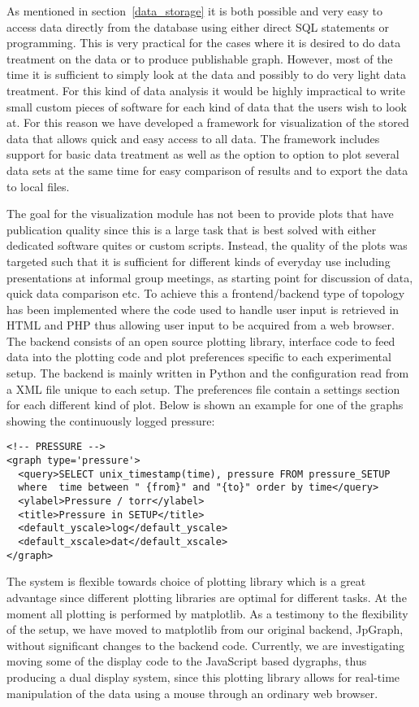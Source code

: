 As mentioned in section~\ref{data_storage} it is both possible and
very easy to access data directly from the database using either
direct SQL statements or programming. This is very practical for the
cases where it is desired to do data treatment on the data or to
produce publishable graph. However, most of the time it is sufficient
to simply look at the data and possibly to do very light data
treatment. For this kind of data analysis it would be highly
impractical to write small custom pieces of software for each kind of
data that the users wish to look at. For this reason we have developed
a framework for visualization of the stored data that allows quick and
easy access to all data. The framework includes support for basic data
treatment as well as the option to option to plot several data sets at
the same time for easy comparison of results and to export the data to
local files.

The goal for the visualization module has not been to provide plots
that have publication quality since this is a large task that is best
solved with either dedicated software quites or custom
scripts. Instead, the quality of the plots was targeted such that it
is sufficient for different kinds of everyday use including
presentations at informal group meetings, as starting point for
discussion of data, quick data comparison etc. To achieve this a
frontend/backend type of topology has been implemented where the code
used to handle user input is retrieved in HTML and PHP thus allowing
user input to be acquired from a web browser.  The backend consists of
an open source plotting library, interface code to feed data into the
plotting code and plot preferences specific to each experimental
setup. The backend is mainly written in Python\cite{python} and the
configuration read from a XML file unique to each setup. The
preferences file contain a settings section for each different kind of
plot. Below is shown an example for one of the graphs showing the
continuously logged pressure:
\begin{verbatim}
<!-- PRESSURE -->
<graph type='pressure'>
  <query>SELECT unix_timestamp(time), pressure FROM pressure_SETUP
  where  time between " {from}" and "{to}" order by time</query>
  <ylabel>Pressure / torr</ylabel>
  <title>Pressure in SETUP</title>
  <default_yscale>log</default_yscale>
  <default_xscale>dat</default_xscale>
</graph>
\end{verbatim}

The system is flexible towards choice of plotting library which is a
great advantage since different plotting libraries are optimal for
different tasks.  At the moment all plotting is performed by
matplotlib\cite{matplotlib}.  As a testimony to the flexibility of the
setup, we have moved to matplotlib from our original backend,
JpGraph\cite{jpgraph}, without significant changes to the backend
code. Currently, we are investigating moving some of the display code
to the JavaScript based dygraphs\cite{dygraphs}, thus producing a dual
display system, since this plotting library allows for real-time
manipulation of the data using a mouse through an ordinary web
browser.
